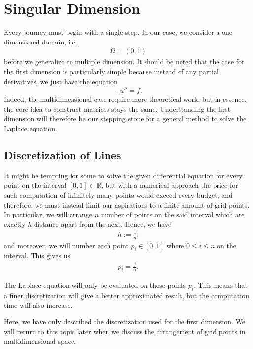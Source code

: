 \section{Singular Dimension}

Every journey must begin with a single step. In our case, we consider a one dimensional domain, i.e.
\begin{align*}
    \Omega = (0, 1)
\end{align*}
before we generalize to multiple dimension. It should be noted that the case for the first dimension is particularly simple because instead of any partial derivatives, we just have the equation
\begin{align*}
    - u'' = f \text{.}
\end{align*}
Indeed, the multidimensional case require more theoretical work, but in essence, the core idea to construct matrices stays the same. Understanding the first dimension will therefore be our stepping stone for a general method to solve the Laplace equation.

\subsection{Discretization of Lines}

It might be tempting for some to solve the given differential equation for every point on the interval \([0, 1] \subset \mathbb{R}\), but with a numerical approach the price for such computation of infinitely many points would exceed every budget, and therefore, we must instead limit our aspirations to a finite amount of grid points. In particular, we will arrange \(n\) number of points on the said interval which are exactly \(h\) distance apart from the next. Hence, we have
\begin{align*}
	h := \frac{1}{n} \text{,}
\end{align*}
and moreover, we will number each point \(p_i \in [0, 1]\) where \(0 \leq i \leq n\)  on the interval. This gives us
\begin{align*}
	p_i = \frac{j}{n} \text{.}
\end{align*}

The Laplace equation will only be evaluated on these points \(p_i\). This means that a finer discretization will give a better approximated result, but the computation time will also increase.

Here, we have only described the discretization used for the first dimension. We will return to this topic later when we discuss the arrangement of grid points in multidimensional space.

